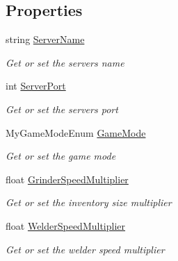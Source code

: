 \subsection*{Properties}
\begin{DoxyCompactItemize}
\item 
string \hyperlink{class_s_e_mod_a_p_i_1_1_a_p_i_1_1_definitions_1_1_dedicated_config_definition_a7b9caf380652fce6002c37f2f5eb214f}{Server\+Name}
\begin{DoxyCompactList}\small\item\em Get or set the server\textquotesingle{}s name \end{DoxyCompactList}\item 
int \hyperlink{class_s_e_mod_a_p_i_1_1_a_p_i_1_1_definitions_1_1_dedicated_config_definition_a4bea2e7792948fd208c3995af3899f71}{Server\+Port}
\begin{DoxyCompactList}\small\item\em Get or set the server\textquotesingle{}s port \end{DoxyCompactList}\item 
My\+Game\+Mode\+Enum \hyperlink{class_s_e_mod_a_p_i_1_1_a_p_i_1_1_definitions_1_1_dedicated_config_definition_a855cb307a79e27f29d77e2f3012920d5}{Game\+Mode}
\begin{DoxyCompactList}\small\item\em Get or set the game mode \end{DoxyCompactList}\item 
float \hyperlink{class_s_e_mod_a_p_i_1_1_a_p_i_1_1_definitions_1_1_dedicated_config_definition_a056c3c9b1759e8b0e4eea547488b85ef}{Grinder\+Speed\+Multiplier}
\begin{DoxyCompactList}\small\item\em Get or set the inventory size multiplier \end{DoxyCompactList}\item 
float \hyperlink{class_s_e_mod_a_p_i_1_1_a_p_i_1_1_definitions_1_1_dedicated_config_definition_a39817c1baea3c456904b24ec4af97509}{Welder\+Speed\+Multiplier}
\begin{DoxyCompactList}\small\item\em Get or set the welder speed multiplier \end{DoxyCompactList}\item 

\end{DoxyCompactItemize}

